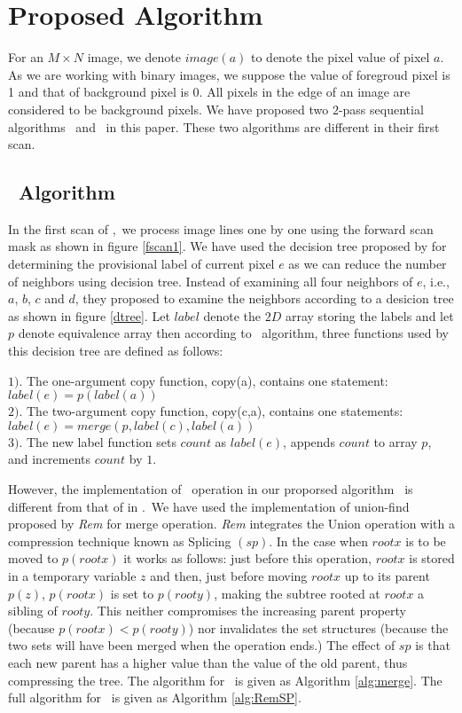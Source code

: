 \section{Proposed Algorithm}
\label{sec:proposed_algorithm}

For an $M \times N$ image, we denote $image(a)$ to denote the pixel value of pixel $a$. As we are working with
binary images, we suppose the value of foregroud pixel is 1 and that of background pixel is 0. All pixels in 
the edge of an image are considered to be background pixels. We have proposed two $2$-pass sequential algorithms
\remsp\ and \aremsp\ in this paper. These two algorithms are different in their
first scan.

\subsection{\remsp\ Algorithm}


In the first scan of \remsp,\ we process image lines one by one using the
forward scan mask as shown in figure \ref{fscan1}. We have used the decision 
tree proposed by \cite{Wu2009_LRPC} for determining the provisional label of current pixel
$e$ as we can reduce the number of neighbors using decision tree. Instead of
examining all four neighbors of $e$, i.e., $a$, $b$, $c$ and $d$, they proposed
to examine the neighbors according to a desicion tree as shown in figure \ref{dtree}.
 Let $label$ denote the $2D$ array storing the labels and let $p$ denote equivalence array 
 then according to \lrpc\ algorithm,
three functions used by this decision tree are defined as follows:

$1)$. The one-argument copy function, copy(a), contains one statement:
					$label(e) = p(label(a))$\\
$2)$. The two-argument copy function, copy(c,a), contains one statements:
				$label(e) = merge(p, label(c), label(a))$\\
$3)$. The new label function sets $count$ as $label(e)$, appends $count$ to array $p$, and increments $count$ by $1$.



However, the implementation of \merge\ operation in our proporsed algorithm
\remsp\ is different from that of in \lrpc.\
We have used the implementation of union-find proposed by {\em Rem}
\cite{Patwary2010_RemSP} for merge operation. {\em Rem} integrates the Union
operation with a compression technique known as Splicing $(sp)$. In the case when 
$rootx$ is to be moved to $p(rootx)$ it works as follows: just before this operation, 
$rootx$ is stored in a temporary variable $z$ and 
then, just before moving $rootx$ up to its parent $p(z)$, $p(rootx)$ is set to $p(rooty)$, 
making the subtree rooted at 
$rootx$ a sibling of $rooty$. This neither compromises the increasing parent property (because $p(rootx) < p(rooty)$) 
nor invalidates the set structures (because the two sets will have been merged when the operation ends.) The effect of $sp$
is that each new parent has a higher value than the value of the old parent, thus compressing the tree. The algorithm for
\merge\ is given as Algorithm \ref{alg:merge}. The full algorithm for \remsp\ is
given as Algorithm \ref{alg:RemSP}.
% 


